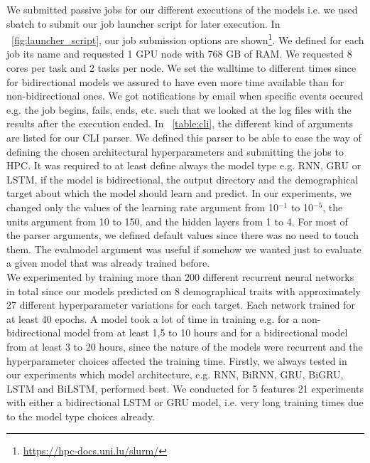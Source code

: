 \documentclass[11pt,oneside,a4paper,openright]{book}
\begin{document}
We submitted passive jobs for our different executions of the models i.e. we used sbatch to submit our job launcher script for later execution. In ~\autoref{fig:launcher_script}, our job submission options are shown\footnote{\url{https://hpc-docs.uni.lu/slurm/}}. We defined for each job its name and requested 1 GPU node with 768 GB of RAM. We requested 8 cores per task and 2 tasks per node.  We set the walltime to different times since for bidirectional models we assured to have even more time available than for non-bidirectional ones. We got notifications by email when specific events occured e.g. the job begins, fails, ends, etc. such that we looked at the log files with the results after the execution ended. In ~\autoref{table:cli}, the different kind of arguments are listed for our CLI parser. We defined this parser to be able to ease the way of defining the chosen architectural hyperparameters and submitting the jobs to HPC. It was required to at least define always the model type e.g. RNN, GRU or LSTM, if the model is bidirectional, the output directory and the demographical target about which the model should learn and predict. In our experiments, we changed only the values of the learning rate argument from 10$^{-1}$ to 10$^{-5}$, the units argument from 10 to 150, and the hidden layers from 1 to 4. For most of the parser arguments, we defined default values since there was no need to touch them. The eval\textunderscore model argument was useful if somehow we wanted just to evaluate a given model that was already trained before.\\

We experimented by training more than 200 different recurrent neural networks in total since our models predicted on 8 demographical traits with approximately 27 different hyperparameter variations for each target. Each network trained for at least 40 epochs. A model took a lot of time in training e.g. for a non-bidirectional model from at least 1,5 to 10 hours and for a bidirectional model from at least 3 to 20 hours, since the nature of the models were recurrent and the hyperparameter choices affected the training time. Firstly, we always tested in our experiments which model architecture, e.g. RNN, BiRNN, GRU, BiGRU, LSTM and BiLSTM, performed best. We conducted for 5 features 21 experiments with  either a bidirectional LSTM or GRU model, i.e. very long training times due to the model type choices already.\\
\end{document}
